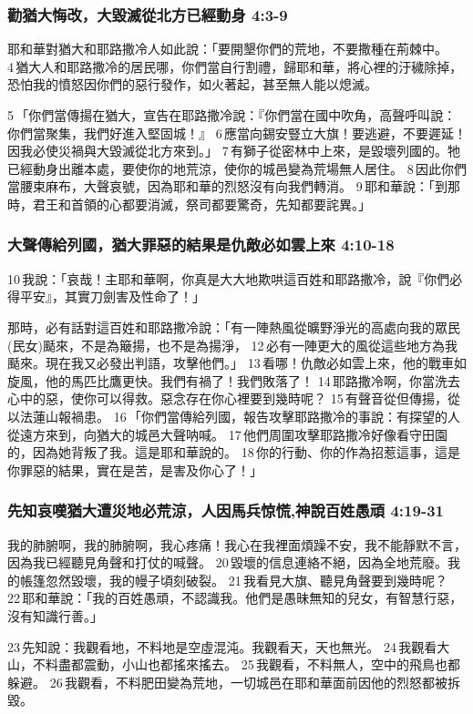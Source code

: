 \subsubsection{勸猶大悔改，大毀滅從北方已經動身 4:3-9}
耶和華對猶大和耶路撒冷人如此說：「要開墾你們的荒地，不要撒種在荊棘中。 4 猶大人和耶路撒冷的居民哪，你們當自行割禮，歸耶和華，將心裡的汙穢除掉，恐怕我的憤怒因你們的惡行發作，如火著起，甚至無人能以熄滅。

5 「你們當傳揚在猶大，宣告在耶路撒冷說：『你們當在國中吹角，高聲呼叫說：你們當聚集，我們好進入堅固城！』 6 應當向錫安豎立大旗！要逃避，不要遲延！因我必使災禍與大毀滅從北方來到。」 7 有獅子從密林中上來，是毀壞列國的。牠已經動身出離本處，要使你的地荒涼，使你的城邑變為荒場無人居住。 8 因此你們當腰束麻布，大聲哀號，因為耶和華的烈怒沒有向我們轉消。 9 耶和華說：「到那時，君王和首領的心都要消滅，祭司都要驚奇，先知都要詫異。」

\subsubsection{大聲傳給列國，猶大罪惡的結果是仇敵必如雲上來 4:10-18}
10 我說：「哀哉！主耶和華啊，你真是大大地欺哄這百姓和耶路撒冷，說『你們必得平安』，其實刀劍害及性命了！」

那時，必有話對這百姓和耶路撒冷說：「有一陣熱風從曠野淨光的高處向我的眾民(民女)颳來，不是為簸揚，也不是為揚淨， 12 必有一陣更大的風從這些地方為我颳來。現在我又必發出判語，攻擊他們。」 13 看哪！仇敵必如雲上來，他的戰車如旋風，他的馬匹比鷹更快。我們有禍了！我們敗落了！ 14 耶路撒冷啊，你當洗去心中的惡，使你可以得救。惡念存在你心裡要到幾時呢？ 15 有聲音從但傳揚，從以法蓮山報禍患。 16 「你們當傳給列國，報告攻擊耶路撒冷的事說：有探望的人從遠方來到，向猶大的城邑大聲呐喊。 17 他們周圍攻擊耶路撒冷好像看守田園的，因為她背叛了我。這是耶和華說的。 18 你的行動、你的作為招惹這事，這是你罪惡的結果，實在是苦，是害及你心了！」

\subsubsection{先知哀嘆猶大遭災地必荒涼，人因馬兵惊慌,神說百姓愚頑 4:19-31}
我的肺腑啊，我的肺腑啊，我心疼痛！我心在我裡面煩躁不安，我不能靜默不言，因為我已經聽見角聲和打仗的喊聲。 20 毀壞的信息連絡不絕，因為全地荒廢。我的帳篷忽然毀壞，我的幔子頃刻破裂。 21 我看見大旗、聽見角聲要到幾時呢？ 22 耶和華說：「我的百姓愚頑，不認識我。他們是愚昧無知的兒女，有智慧行惡，沒有知識行善。」

23 先知說：我觀看地，不料地是空虛混沌。我觀看天，天也無光。 24 我觀看大山，不料盡都震動，小山也都搖來搖去。 25 我觀看，不料無人，空中的飛鳥也都躲避。 26 我觀看，不料肥田變為荒地，一切城邑在耶和華面前因他的烈怒都被拆毀。

